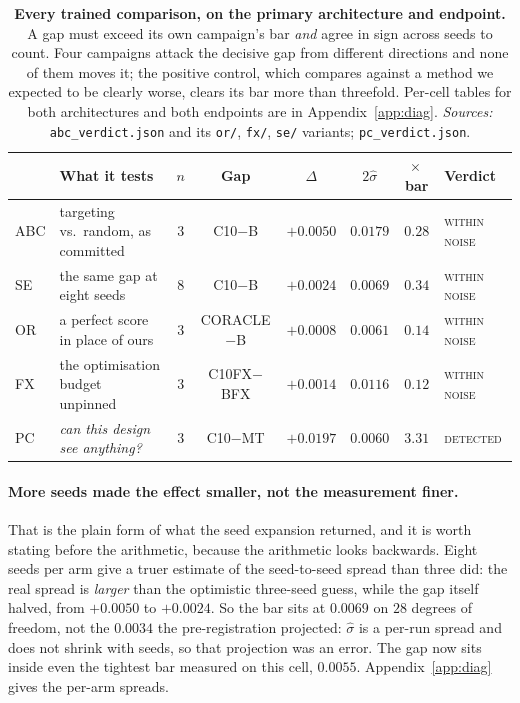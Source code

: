 \documentclass{article}
\begin{document}
\begin{table}[t]
\caption{\textbf{Every trained comparison, on the primary architecture and endpoint.} A gap must
exceed its own campaign's bar \emph{and} agree in sign across seeds to count. Four campaigns attack
the decisive gap from different directions and none of them moves it; the positive control, which
compares against a method we expected to be clearly worse, clears its bar more than threefold.
Per-cell tables for both architectures and both endpoints are in Appendix~\ref{app:diag}.
\emph{Sources:} \texttt{abc\_verdict.json} and its \texttt{or/}, \texttt{fx/}, \texttt{se/}
variants; \texttt{pc\_verdict.json}.}
\label{tab:trained}
\begin{center}
\small
\setlength{\tabcolsep}{4pt}
\begin{tabular}{@{}llcccccl@{}}
\toprule
& What it tests & $n$ & Gap & $\Delta$ & $2\hat{\sigma}$ & $\times$\,bar & Verdict \\
\midrule
ABC & targeting vs.\ random, as committed & $3$ & C10$-$B & $+0.0050$ & $0.0179$ & $0.28$ & \textsc{within noise} \\
SE & the same gap at eight seeds & $8$ & C10$-$B & $+0.0024$ & $0.0069$ & $0.34$ & \textsc{within noise} \\
OR & a perfect score in place of ours & $3$ & CORACLE$-$B & $+0.0008$ & $0.0061$ & $0.14$ & \textsc{within noise} \\
FX & the optimisation budget unpinned & $3$ & C10FX$-$BFX & $+0.0014$ & $0.0116$ & $0.12$ & \textsc{within noise} \\
\midrule
PC & \emph{can this design see anything?} & $3$ & C10$-$MT & $+0.0197$ & $0.0060$ & $\mathbf{3.31}$ & \textsc{detected} \\
\bottomrule
\end{tabular}
\end{center}
\end{table}

\paragraph{More seeds made the effect smaller, not the measurement finer.} That is the plain form of
what the seed expansion returned, and it is worth stating before the arithmetic, because the
arithmetic looks backwards. Eight seeds per arm give a truer estimate of the seed-to-seed spread
than three did: the real spread is \emph{larger} than the optimistic three-seed guess, while the gap
itself halved, from $+0.0050$ to $+0.0024$. So the bar sits at $0.0069$ on $28$ degrees of freedom,
not the $0.0034$ the pre-registration projected: $\hat{\sigma}$ is a per-run spread and does not
shrink with seeds, so that projection was an error. The gap now sits inside even the tightest bar
measured on this cell, $0.0055$.
Appendix~\ref{app:diag} gives the per-arm spreads.
\end{document}
